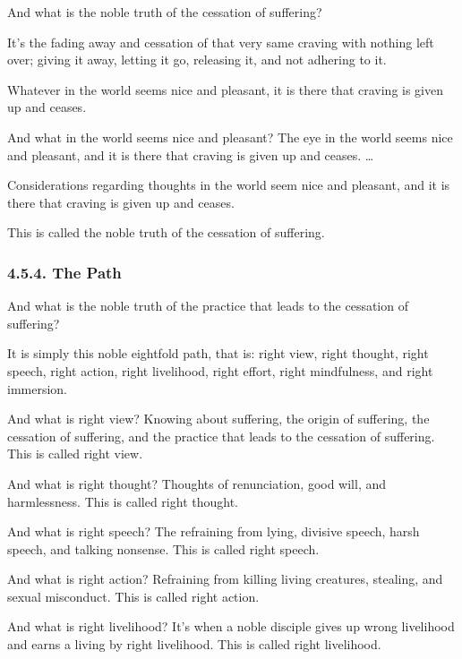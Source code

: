 \documentclass[12pt,openany]{book}%
\begin{document}
And what is the noble truth of the cessation of suffering? 

It’s the fading away and cessation of that very same craving with nothing left over; giving it away, letting it go, releasing it, and not adhering to it. 

Whatever in the world seems nice and pleasant, it is there that craving is given up and ceases. 

And what in the world seems nice and pleasant? The eye in the world seems nice and pleasant, and it is there that craving is given up and ceases. … 

Considerations regarding thoughts in the world seem nice and pleasant, and it is there that craving is given up and ceases. 

This is called the noble truth of the cessation of suffering. 

\subsubsection*{4.5.4. The Path }

And what is the noble truth of the practice that leads to the cessation of suffering? 

It is simply this noble eightfold path, that is: right view, right thought, right speech, right action, right livelihood, right effort, right mindfulness, and right immersion. 

And what is right view? Knowing about suffering, the origin of suffering, the cessation of suffering, and the practice that leads to the cessation of suffering. This is called right view. 

And what is right thought? Thoughts of renunciation, good will, and harmlessness. This is called right thought. 

And what is right speech? The refraining from lying, divisive speech, harsh speech, and talking nonsense. This is called right speech. 

And what is right action? Refraining from killing living creatures, stealing, and sexual misconduct. This is called right action. 

And what is right livelihood? It’s when a noble disciple gives up wrong livelihood and earns a living by right livelihood. This is called right livelihood. 
\end{document}
